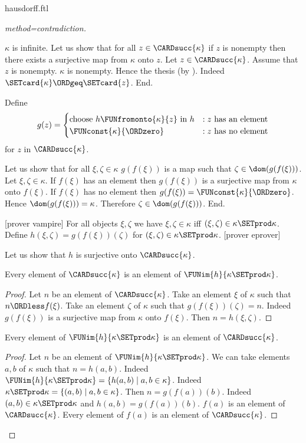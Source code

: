 \documentclass{article}
\begin{document}
\begin{smodule}{hausdorff.ftl}
\begin{forthel}
\begin{proof}[method=contradiction]
\begin{case}{$\kappa$ is infinite.}
      Let us show that for all $z \in \CARDsucc{\kappa}$ if $z$ is nonempty then there exists a surjective map from $\kappa$ onto $z$.
        Let $z \in \CARDsucc{\kappa}$.
        Assume that $z$ is nonempty.
        $\kappa$ is nonempty.
        Hence the thesis (by ).
        Indeed $\SETcard{\kappa} \ORDgeq \SETcard{z}$.
      End.
  
      Define \[ g(z) =
        \begin{cases}
          \text{choose $h \FUNfromonto{\kappa}{z}$ in $h$}
          & : \text{$z$ has an element}
          \\
          \text{$\FUNconst{\kappa}{\ORDzero}$}
          & : \text{$z$ has no element}
        \end{cases}
      \] for $z$ in $\CARDsucc{\kappa}$.
  
      Let us show that for all $\xi, \zeta \in \kappa$ $g(f(\xi))$ is a map such that $\zeta \in \dom(g(f(\xi)))$.
        Let $\xi, \zeta \in \kappa$.
        If $f(\xi)$ has an element then $g(f(\xi))$ is a surjective map from $\kappa$ onto $f(\xi)$.
        If $f(\xi)$ has no element then $g(f(\xi)) = \FUNconst{\kappa}{\ORDzero}$.
        Hence $\dom(g(f(\xi))) = \kappa$.
        Therefore $\zeta \in \dom(g(f(\xi)))$.
      End.
  
      [prover vampire]
      For all objects $\xi, \zeta$ we have $\xi, \zeta \in \kappa$ iff $(\xi, \zeta) \in \kappa \SETprod \kappa$.
      Define $h(\xi,\zeta) = g(f(\xi))(\zeta)$ for $(\xi,\zeta) \in \kappa \SETprod \kappa$.
      [prover eprover]

      Let us show that $h$ is surjective onto $\CARDsucc{\kappa}$.
  
        Every element of $\CARDsucc{\kappa}$ is an element of $\FUNim{h}{\kappa \SETprod \kappa}$.
        \begin{proof}
          Let $n$ be an element of $\CARDsucc{\kappa}$.
          Take an element $\xi$ of $\kappa$ such that $n \ORDless f(\xi)$.
          Take an element $\zeta$ of $\kappa$ such that $g(f(\xi))(\zeta) = n$.
          Indeed $g(f(\xi))$ is a surjective map from $\kappa$ onto $f(\xi)$.
          Then $n = h(\xi,\zeta)$.
        \end{proof}
  
        Every element of $\FUNim{h}{\kappa \SETprod \kappa}$ is an element of $\CARDsucc{\kappa}$.
        \begin{proof}
          Let $n$ be an element of $\FUNim{h}{\kappa \SETprod \kappa}$.
          We can take elements $a, b$ of $\kappa$ such that $n = h(a,b)$.
          Indeed $\FUNim{h}{\kappa \SETprod \kappa} = \{h(a,b) \mid a,b \in \kappa\}$.
          Indeed $\kappa \SETprod \kappa = \{(a,b) \mid a,b \in \kappa\}$.
          Then $n = g(f(a))(b)$.
          Indeed $(a,b) \in \kappa \SETprod \kappa$ and $h(a,b) = g(f(a))(b)$.
          $f(a)$ is an element of $\CARDsucc{\kappa}$.
          Every element of $f(a)$ is an element of $\CARDsucc{\kappa}$.
  

\end{proof}
\end{case}
\end{proof}
\end{forthel}
\end{smodule}
\end{document}
